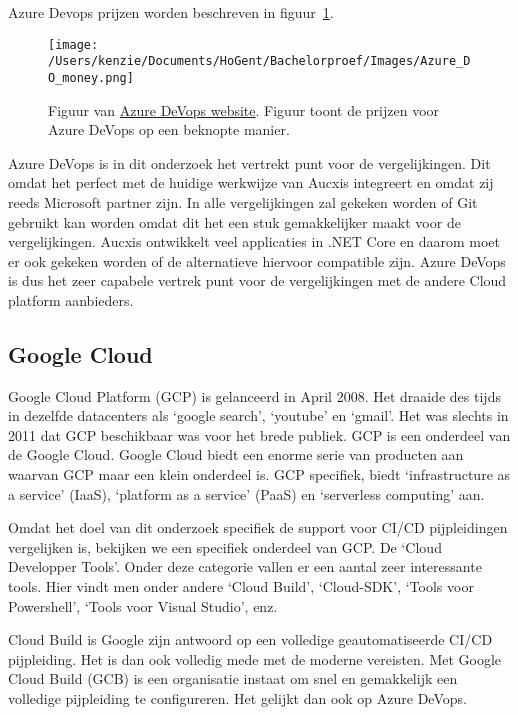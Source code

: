 Azure Devops prijzen worden beschreven in figuur~\ref{fig:A_DO_Money}.

\begin{figure}[!htbp]
    \centering
    \texttt{[image: /Users/kenzie/Documents/HoGent/Bachelorproef/Images/Azure\_DO\_money.png]}
    \caption{Figuur van \href{https://azure.microsoft.com/nl-nl/pricing/details/devops/azure-devops-services/}{Azure DeVops website}. Figuur toont de prijzen voor Azure DeVops op een beknopte manier.}
    \label{fig:A_DO_Money}
\end{figure}

Azure DeVops is in dit onderzoek het vertrekt punt voor de vergelijkingen. Dit omdat het perfect met de huidige werkwijze van Aucxis integreert en omdat zij reeds Microsoft partner zijn. In alle vergelijkingen zal gekeken worden of Git gebruikt kan worden omdat dit het een stuk gemakkelijker maakt voor de vergelijkingen. Aucxis ontwikkelt veel applicaties in .NET Core en daarom moet er ook gekeken worden of de alternatieve hiervoor compatible zijn. Azure DeVops is dus het zeer capabele vertrek punt voor de vergelijkingen met de andere Cloud platform aanbieders.
\subsection{Google Cloud}
Google Cloud Platform (GCP) is gelanceerd in April 2008. Het draaide des tijds in dezelfde datacenters als ‘google search’, ‘youtube’ en ‘gmail’. Het was slechts in 2011 dat GCP beschikbaar was voor het brede publiek. GCP is een onderdeel van de Google Cloud. Google Cloud biedt een enorme serie van producten aan waarvan GCP maar een klein onderdeel is. GCP specifiek, biedt ‘infrastructure as a service’ (IaaS), ‘platform as a service’ (PaaS) en ‘serverless computing’ aan. 

Omdat het doel van dit onderzoek specifiek de support voor CI/CD pijpleidingen vergelijken is, bekijken we een specifiek onderdeel van GCP. De ‘Cloud Developper Tools’. Onder deze categorie vallen er een aantal zeer interessante tools. Hier vindt men onder andere ‘Cloud Build’, ‘Cloud-SDK’, ‘Tools voor Powershell’, ‘Tools voor Visual Studio’, enz.

Cloud Build is Google zijn antwoord op een volledige geautomatiseerde CI/CD pijpleiding. Het is dan ook volledig mede met de moderne vereisten. Met Google Cloud Build (GCB) is een organisatie instaat om snel en gemakkelijk een volledige pijpleiding te configureren. Het gelijkt dan ook op Azure DeVops.

